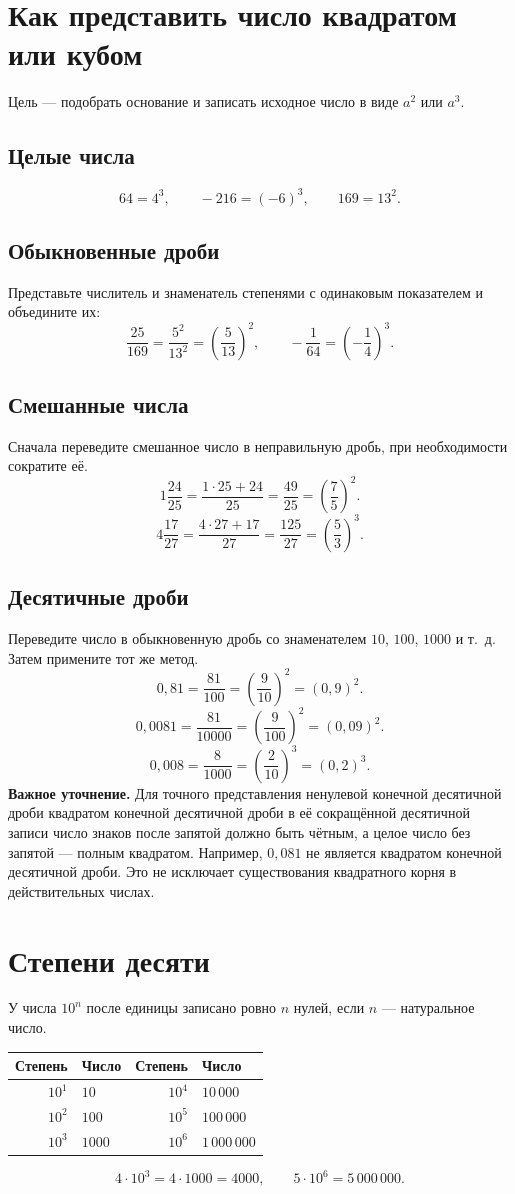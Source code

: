 \documentclass[a4paper,12pt]{article}
\newcommand{\idea}[1]{\textcolor{darkaccent}{\textbf{#1}}}
\newcommand{\ex}[1]{\subsection*{#1}}
\begin{document}
\section{Как представить число квадратом или кубом}
Цель --- подобрать основание и записать исходное число в виде $a^2$ или $a^3$.
\ex{Целые числа}
\[
 64=4^3,\qquad -216=(-6)^3,\qquad 169=13^2.
\]
\ex{Обыкновенные дроби}
Представьте числитель и знаменатель степенями с одинаковым показателем и объедините их:
\[
 \frac{25}{169}=\frac{5^2}{13^2}=\left(\frac5{13}\right)^2,
 \qquad -\frac1{64}=\left(-\frac14\right)^3.
\]
\ex{Смешанные числа}
Сначала переведите смешанное число в неправильную дробь, при необходимости сократите её.
\[
 1\frac{24}{25}=\frac{1\cdot25+24}{25}=\frac{49}{25}
 =\left(\frac75\right)^2.
\]
\[
 4\frac{17}{27}=\frac{4\cdot27+17}{27}=\frac{125}{27}
 =\left(\frac53\right)^3.
\]
\ex{Десятичные дроби}
Переведите число в обыкновенную дробь со знаменателем $10$, $100$, $1000$ и т.~д. Затем примените тот же метод.
\[
 0,81=\frac{81}{100}=\left(\frac9{10}\right)^2=(0,9)^2.
\]
\[
 0,0081=\frac{81}{10000}=\left(\frac9{100}\right)^2=(0,09)^2.
\]
\[
 0,008=\frac8{1000}=\left(\frac2{10}\right)^3=(0,2)^3.
\]
\idea{Важное уточнение.} Для точного представления ненулевой конечной десятичной дроби квадратом конечной десятичной дроби в её сокращённой десятичной записи число знаков после запятой должно быть чётным, а целое число без запятой --- полным квадратом. Например, $0,081$ не является квадратом конечной десятичной дроби. Это не исключает существования квадратного корня в действительных числах.
\clearpage
\section{Степени десяти}
У числа $10^n$ после единицы записано ровно $n$ нулей, если $n$ --- натуральное число.
\begin{center}
\renewcommand{\arraystretch}{1.25}
\begin{tabular}{@{}rl@{\qquad}rl@{}}
\toprule
Степень&Число&Степень&Число\\\midrule
$10^1$&$10$&$10^4$&$10\,000$\\
$10^2$&$100$&$10^5$&$100\,000$\\
$10^3$&$1000$&$10^6$&$1\,000\,000$\\\bottomrule
\end{tabular}
\end{center}
\[
 4\cdot10^3=4\cdot1000=4000,\qquad 5\cdot10^6=5\,000\,000.
\]
\end{document}
